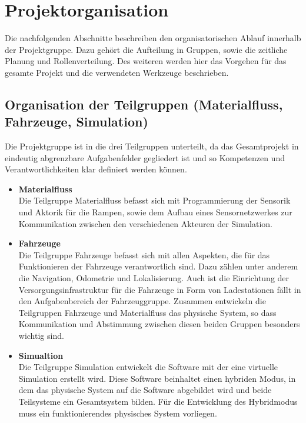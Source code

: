 \section{Projektorganisation}
Die nachfolgenden Abschnitte beschreiben den organisatorischen Ablauf innerhalb der Projektgruppe. Dazu geh\"ort die Aufteilung in Gruppen, sowie die zeitliche Planung und Rollenverteilung. Des weiteren werden hier das Vorgehen f\"ur das gesamte Projekt und die verwendeten Werkzeuge beschrieben.

\subsection{Organisation der Teilgruppen (Materialfluss, Fahrzeuge, Simulation)}
Die Projektgruppe ist in die drei Teilgruppen unterteilt,  da das Gesamtprojekt in eindeutig abgrenzbare Aufgabenfelder gegliedert ist und so Kompetenzen und Verantwortlichkeiten klar definiert werden können. 

\begin{itemize}
\item \textbf{Materialfluss} \\
Die Teilgruppe Materialfluss befasst sich mit Programmierung der Sensorik und Aktorik für die Rampen, sowie dem Aufbau eines Sensornetzwerkes zur Kommunikation zwischen den verschiedenen Akteuren der Simulation. 

\item \textbf{Fahrzeuge} \\
Die Teilgruppe Fahrzeuge befasst sich mit allen Aspekten, die für das Funktionieren der Fahrzeuge verantwortlich sind. Dazu zählen unter anderem die Navigation, Odometrie und Lokalisierung. Auch ist die Einrichtung der Versorgungsinfrastruktur für die Fahrzeuge in Form von Ladestationen f\"allt in den Aufgabenbereich der Fahrzeuggruppe. Zusammen entwickeln die Teilgruppen Fahrzeuge und Materialfluss das physische System, so dass Kommunikation und Abstimmung zwischen diesen beiden Gruppen besonders wichtig sind. 

\item \textbf{Simualtion} \\
Die Teilgruppe Simulation entwickelt die Software mit der eine virtuelle Simulation erstellt wird. Diese Software beinhaltet einen hybriden Modus, in dem das physische System auf die Software abgebildet wird und beide Teilsysteme ein Gesamtsystem bilden. Für die Entwicklung des Hybridmodus muss ein funktionierendes physisches System vorliegen.
\end{itemize}

